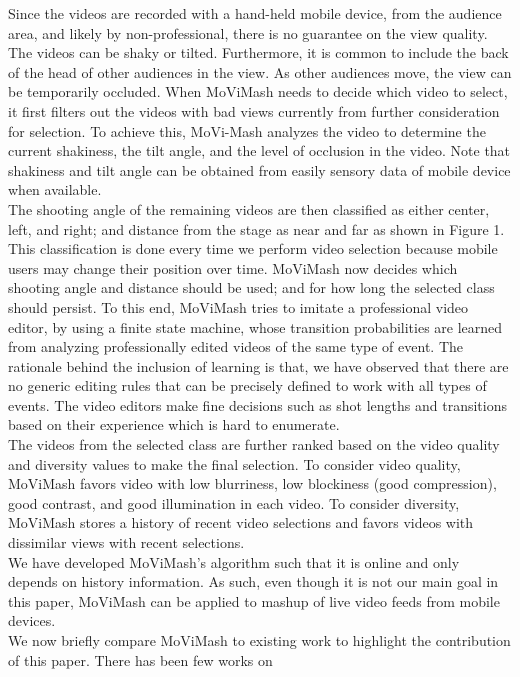 \documentclass{sig-alternate}
\begin{document}
Since the videos are recorded with a hand-held mobile device,
from the audience area, and likely by non-professional, there is no
guarantee on the view quality. The videos can be shaky or tilted.
Furthermore, it is common to include the back of the head of other
audiences in the view. As other audiences move, the view can be
temporarily occluded. When MoViMash needs to decide which
video to select, it first filters out the videos with bad views currently
from further consideration for selection. To achieve this, MoVi-Mash analyzes the video to determine the current shakiness, the tilt angle, and the level of occlusion in the video. Note that shakiness
and tilt angle can be obtained from easily sensory data of mobile
device when available.\\
The shooting angle of the remaining videos are then classified as
either center, left, and right; and distance from the stage as near and
far as shown in Figure 1. This classification is done every time we
perform video selection because mobile users may change their position over time. MoViMash now decides which shooting angle and
distance should be used; and for how long the selected class should
persist. To this end, MoViMash tries to imitate a professional video
editor, by using a finite state machine, whose transition probabilities are learned from analyzing professionally edited videos of the
same type of event. The rationale behind the inclusion of learning is that, we have observed that there are no generic editing rules
that can be precisely defined to work with all types of events. The
video editors make fine decisions such as shot lengths and transitions based on their experience which is hard to enumerate.\\
The videos from the selected class are further ranked based on
the video quality and diversity values to make the final selection.
To consider video quality, MoViMash favors video with low blurriness, low blockiness (good compression), good contrast, and good
illumination in each video. To consider diversity, MoViMash stores
a history of recent video selections and favors videos with dissimilar views with recent selections.\\
We have developed MoViMash’s algorithm such that it is online
and only depends on history information. As such, even though
it is not our main goal in this paper, MoViMash can be applied to
mashup of live video feeds from mobile devices.\\
We now briefly compare MoViMash to existing work to highlight the contribution of this paper. There has been few works on
\end{document}
